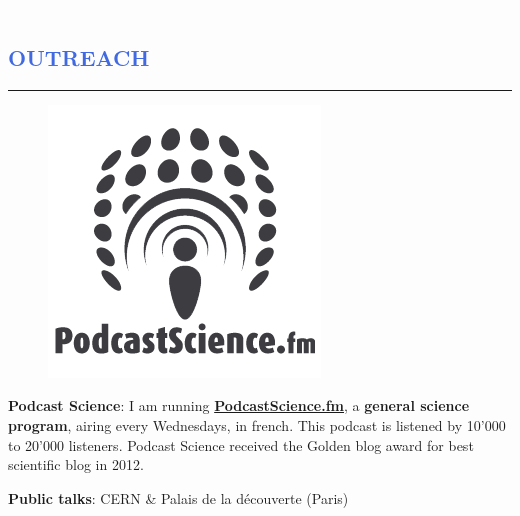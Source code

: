 \documentclass[11pt]{article}
\begin{document}
\newpage
\lfoot{}
\textcolor{White}{.}
\vspace{-1.5cm}
\textcolor{RoyalBlue}{\section{\large OUTREACH}
\vspace{-0.35cm}\hrule}
\vspace{0.5cm}
\begin{figure}
\vspace{-0.95cm}
\begin{mybox}
    \includegraphics[width=1.\textwidth]{figures_CV/PodcastScience.png}
 \end{mybox}
\vspace{-1.1cm}
\end{figure}
\textbf{Podcast Science}: I am running \href{http://www.podcastscience.fm}
{\textbf{PodcastScience.fm}}, a \textbf{general science program}, airing every
Wednesdays, in french. This podcast is listened by 10'000 to 20'000
listeners. Podcast Science received the Golden blog award for
best scientific blog in 2012.

\vspace{0.2cm}

\textbf{Public talks}: CERN \& Palais de la découverte (Paris)\\
\end{document}
